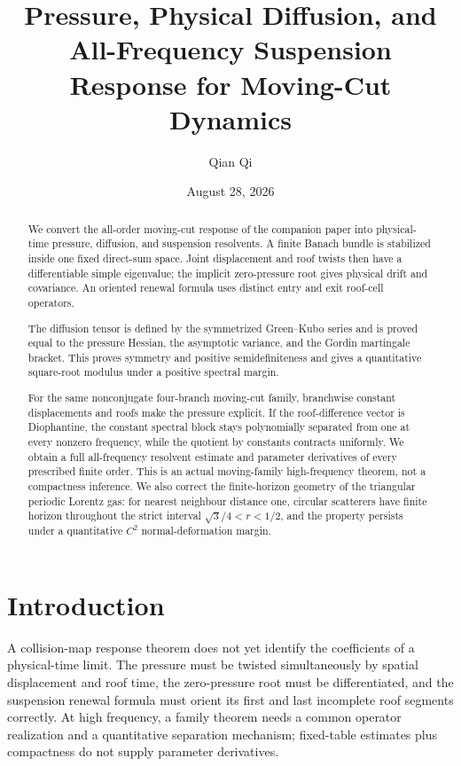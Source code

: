 \documentclass[11pt,reqno]{amsart}
\title[Pressure, diffusion, and all-frequency response]{Pressure, Physical Diffusion, and All-Frequency Suspension Response for Moving-Cut Dynamics}
\author{Qian Qi}
\date{August 28, 2026}
\theoremstyle{definition}
\theoremstyle{remark}
\begin{document}
\begin{abstract}
We convert the all-order moving-cut response of the companion paper into
physical-time pressure, diffusion, and suspension resolvents.  A finite Banach
bundle is stabilized inside one fixed direct-sum space.  Joint displacement
and roof twists then have a differentiable simple eigenvalue; the implicit
zero-pressure root gives physical drift and covariance.  An oriented renewal
formula uses distinct entry and exit roof-cell operators.

The diffusion tensor is defined by the symmetrized Green--Kubo series and is
proved equal to the pressure Hessian, the asymptotic variance, and the Gordin
martingale bracket.  This proves symmetry and positive semidefiniteness and
gives a quantitative square-root modulus under a positive spectral margin.

For the same nonconjugate four-branch moving-cut family, branchwise constant
displacements and roofs make the pressure explicit.  If the roof-difference
vector is Diophantine, the constant spectral block stays polynomially separated
from one at every nonzero frequency, while the quotient by constants contracts
uniformly.  We obtain a full all-frequency resolvent estimate and parameter
derivatives of every prescribed finite order.  This is an actual moving-family
high-frequency theorem, not a compactness inference.  We also correct the
finite-horizon geometry of the triangular periodic Lorentz gas: for nearest
neighbour distance one, circular scatterers have finite horizon throughout the
strict interval $\sqrt3/4<r<1/2$, and the property persists under a quantitative
$C^2$ normal-deformation margin.
\end{abstract}

\maketitle
\tableofcontents

\section{Introduction}

A collision-map response theorem does not yet identify the coefficients of a
physical-time limit.  The pressure must be twisted simultaneously by spatial
displacement and roof time, the zero-pressure root must be differentiated, and
the suspension renewal formula must orient its first and last incomplete roof
segments correctly.  At high frequency, a family theorem needs a common
operator realization and a quantitative separation mechanism; fixed-table
estimates plus compactness do not supply parameter derivatives.
\end{document}
